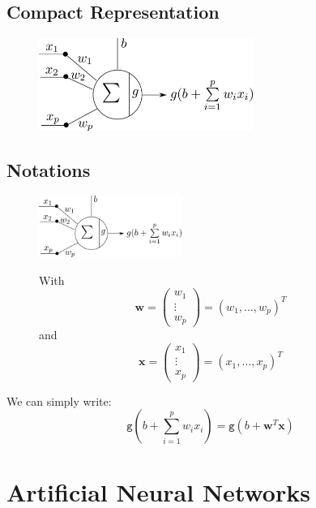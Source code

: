 \documentclass{book}
\newcommand{\x}{\mathbf{x}}
\newcommand{\act}{\texttt{g}}%
\begin{document}
\section{Compact Representation}

\begin{figure}[h]
    \centering
    \includegraphics[height=3cm]{neurone_representation_compacte}
\end{figure}

\section{Notations}

\begin{figure}[h]
    \centering
    \begin{minipage}{.5\textwidth}
        \centering
        \includegraphics[height=2cm]{neurone_representation_compacte}
    \end{minipage}%
    \begin{minipage}{.5\textwidth}
        With
        \[
        \mathbf{w} =
        \begin{pmatrix}
        w_1 \\
        \vdots \\
        w_p
        \end{pmatrix}
        = (w_1, \ldots, w_p)^T
        \]
        and
        \[
        \x =
        \begin{pmatrix}
        x_1 \\
        \vdots \\
        x_p
        \end{pmatrix}
        = (x_1, \ldots, x_p)^T
        \]
    \end{minipage}
\end{figure}

We can simply write:
\[
\act(b+ \sum\limits_{i=1}^p w_ix_i) = \act(b + \mathbf{w}^T\x)
\]

\chapter{Artificial Neural Networks}
\end{document}
